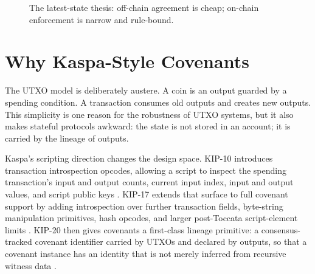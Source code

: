 \documentclass[10pt,a4paper]{article}
\begin{document}
\begin{figure}[t]
\centering
{}
\caption{The latest-state thesis: off-chain agreement is cheap; on-chain enforcement is narrow and rule-bound.}
\label{fig:latest-state-thesis}
\end{figure}

\section{Why Kaspa-Style Covenants}

The UTXO model is deliberately austere. A coin is an output guarded by a spending condition. A transaction consumes old outputs and creates new outputs. This simplicity is one reason for the robustness of UTXO systems, but it also makes stateful protocols awkward: the state is not stored in an account; it is carried by the lineage of outputs.

Kaspa's scripting direction changes the design space. KIP-10 introduces transaction introspection opcodes, allowing a script to inspect the spending transaction's input and output counts, current input index, input and output values, and script public keys \cite{kip10}. KIP-17 extends that surface to full covenant support by adding introspection over further transaction fields, byte-string manipulation primitives, hash opcodes, and larger post-Toccata script-element limits \cite{kip17}. KIP-20 then gives covenants a first-class lineage primitive: a consensus-tracked covenant identifier carried by UTXOs and declared by outputs, so that a covenant instance has an identity that is not merely inferred from recursive witness data \cite{kip20}.
\end{document}
